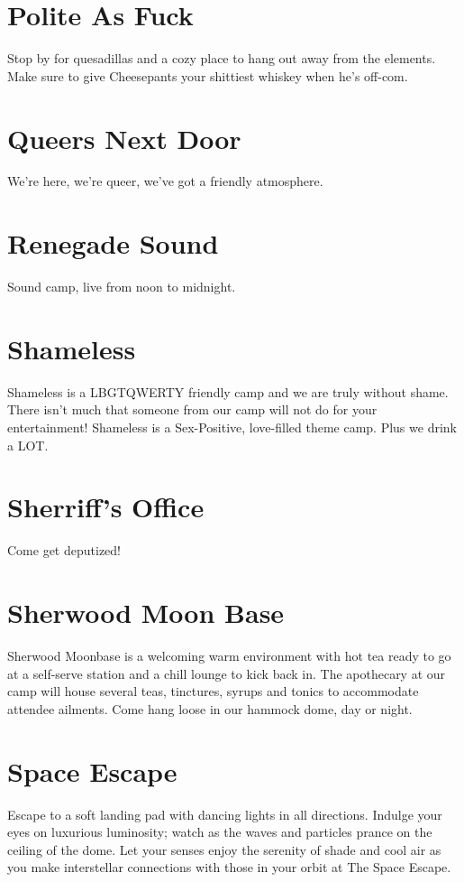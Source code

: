 \section*{Polite As Fuck}
Stop by for quesadillas and a cozy place to hang out away from the elements. Make sure to give Cheesepants your shittiest whiskey when he's off-com. 


\section*{Queers Next Door}
We're here, we're queer, we've got a friendly atmosphere. 


\section*{Renegade Sound}
Sound camp, live from noon to midnight. 


\section*{Shameless}
Shameless is a LBGTQWERTY friendly camp and we are truly without shame. There isn't much that someone from our camp will not do for your entertainment! Shameless is a Sex-Positive, love-filled theme camp. Plus we drink a LOT.  


\section*{Sherriff's Office}
Come get deputized! 


\section*{Sherwood Moon Base}
Sherwood Moonbase is a welcoming warm environment with hot tea ready to go at a self-serve station and a chill lounge to kick back in. The apothecary at our camp will house several teas, tinctures, syrups and tonics to accommodate attendee ailments. Come hang loose in our hammock dome, day or night. 


\section*{Space Escape}
Escape to a soft landing pad with dancing lights in all directions. Indulge your eyes on luxurious luminosity; watch as the waves and particles prance on the ceiling of the dome. Let your senses enjoy the serenity of shade and cool air as you make interstellar connections with those in your orbit at The Space Escape. 


